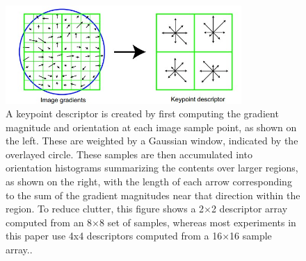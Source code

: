 \begin{figure}[H]
\centering
\includegraphics[width=0.8\textwidth]{img/sift4.jpg}
\caption{ A keypoint descriptor is created by ﬁrst computing the gradient magnitude and orientation
at each image sample point, as shown on the left. These are weighted by a Gaussian window,
indicated by the overlayed circle. These samples are then accumulated into orientation histograms
summarizing the contents over larger regions, as shown on the right, with the length of each arrow
corresponding to the sum of the gradient magnitudes near that direction within the region. To reduce
clutter, this ﬁgure shows a 2$\times$2 descriptor array computed from an 8$\times$8 set of samples, whereas most
experiments in this paper use 4x4 descriptors computed from a 16$\times$16 sample array..}
\label{fig:sift4}
\end{figure}

